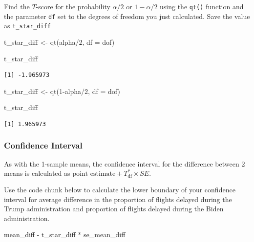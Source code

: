 \documentclass[
  letterpaper,
  DIV=11,
  numbers=noendperiod]{scrartcl}
\newenvironment{Shaded}{\begin{snugshade}}{\end{snugshade}}
\newcommand{\AttributeTok}[1]{\textcolor[rgb]{0.40,0.45,0.13}{#1}}
\newcommand{\DecValTok}[1]{\textcolor[rgb]{0.68,0.00,0.00}{#1}}
\newcommand{\FunctionTok}[1]{\textcolor[rgb]{0.28,0.35,0.67}{#1}}
\newcommand{\NormalTok}[1]{\textcolor[rgb]{0.00,0.23,0.31}{#1}}
\newcommand{\OtherTok}[1]{\textcolor[rgb]{0.00,0.23,0.31}{#1}}
\newcommand{\SpecialCharTok}[1]{\textcolor[rgb]{0.37,0.37,0.37}{#1}}
\begin{document}
Find the \(T\)-score for the probability \(\alpha/2\) or \(1-\alpha/2\)
using the \texttt{qt()} function and the parameter \texttt{df} set to
the degrees of freedom you just calculated. Save the value as
\texttt{t\_star\_diff}

\begin{Shaded}
\begin{Highlighting}[]
\NormalTok{t\_star\_diff }\OtherTok{\textless{}{-}} \FunctionTok{qt}\NormalTok{(alpha}\SpecialCharTok{/}\DecValTok{2}\NormalTok{, }
                  \AttributeTok{df =}\NormalTok{ dof)}

\NormalTok{t\_star\_diff}
\end{Highlighting}
\end{Shaded}

\begin{verbatim}
[1] -1.965973
\end{verbatim}

\begin{Shaded}
\begin{Highlighting}[]
\NormalTok{t\_star\_diff }\OtherTok{\textless{}{-}} \FunctionTok{qt}\NormalTok{(}\DecValTok{1}\SpecialCharTok{{-}}\NormalTok{alpha}\SpecialCharTok{/}\DecValTok{2}\NormalTok{, }
                  \AttributeTok{df =}\NormalTok{ dof)}

\NormalTok{t\_star\_diff}
\end{Highlighting}
\end{Shaded}

\begin{verbatim}
[1] 1.965973
\end{verbatim}

\subsubsection{Confidence Interval}\label{confidence-interval-3}

As with the 1-sample means, the confidence interval for the difference
between 2 means is calculated as
\(\text{point estimate} \pm T^*_{\text{df}} \times SE\).

Use the code chunk below to calculate the lower boundary of your
confidence interval for average difference in the proportion of flights
delayed during the Trump administration and proportion of flights
delayed during the Biden administration.

\begin{Shaded}
\begin{Highlighting}[]
\NormalTok{mean\_diff }\SpecialCharTok{{-}}\NormalTok{ t\_star\_diff }\SpecialCharTok{*}\NormalTok{ se\_mean\_diff}
\end{Highlighting}
\end{Shaded}
\end{document}
